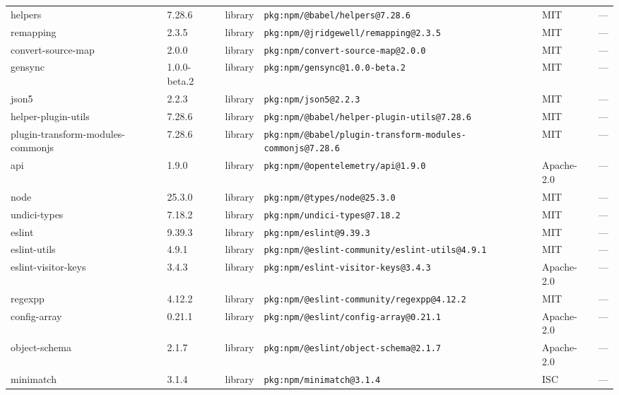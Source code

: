 \documentclass[11pt,a4paper]{article}
\begin{document}
\begin{longtable}{|p{4cm}|p{2cm}|p{1.6cm}|p{5cm}|p{1.5cm}|p{3.5cm}|}
\raggedright helpers & 7.28.6 & library & \small\texttt{pkg:npm/@babel/helpers@7.28.6} & MIT & \small — \\
\raggedright remapping & 2.3.5 & library & \small\texttt{pkg:npm/@jridgewell/remapping@2.3.5} & MIT & \small — \\
\raggedright convert-source-map & 2.0.0 & library & \small\texttt{pkg:npm/convert-source-map@2.0.0} & MIT & \small — \\
\raggedright gensync & 1.0.0-beta.2 & library & \small\texttt{pkg:npm/gensync@1.0.0-beta.2} & MIT & \small — \\
\raggedright json5 & 2.2.3 & library & \small\texttt{pkg:npm/json5@2.2.3} & MIT & \small — \\
\raggedright helper-plugin-utils & 7.28.6 & library & \small\texttt{pkg:npm/@babel/helper-plugin-utils@7.28.6} & MIT & \small — \\
\raggedright plugin-transform-modules-commonjs & 7.28.6 & library & \small\texttt{pkg:npm/@babel/plugin-transform-modules-commonjs@7.28.6} & MIT & \small — \\
\raggedright api & 1.9.0 & library & \small\texttt{pkg:npm/@opentelemetry/api@1.9.0} & Apache-2.0 & \small — \\
\raggedright node & 25.3.0 & library & \small\texttt{pkg:npm/@types/node@25.3.0} & MIT & \small — \\
\raggedright undici-types & 7.18.2 & library & \small\texttt{pkg:npm/undici-types@7.18.2} & MIT & \small — \\
\raggedright eslint & 9.39.3 & library & \small\texttt{pkg:npm/eslint@9.39.3} & MIT & \small — \\
\raggedright eslint-utils & 4.9.1 & library & \small\texttt{pkg:npm/@eslint-community/eslint-utils@4.9.1} & MIT & \small — \\
\raggedright eslint-visitor-keys & 3.4.3 & library & \small\texttt{pkg:npm/eslint-visitor-keys@3.4.3} & Apache-2.0 & \small — \\
\raggedright regexpp & 4.12.2 & library & \small\texttt{pkg:npm/@eslint-community/regexpp@4.12.2} & MIT & \small — \\
\raggedright config-array & 0.21.1 & library & \small\texttt{pkg:npm/@eslint/config-array@0.21.1} & Apache-2.0 & \small — \\
\raggedright object-schema & 2.1.7 & library & \small\texttt{pkg:npm/@eslint/object-schema@2.1.7} & Apache-2.0 & \small — \\
\raggedright minimatch & 3.1.4 & library & \small\texttt{pkg:npm/minimatch@3.1.4} & ISC & \small — \\

\end{longtable}
\end{document}
